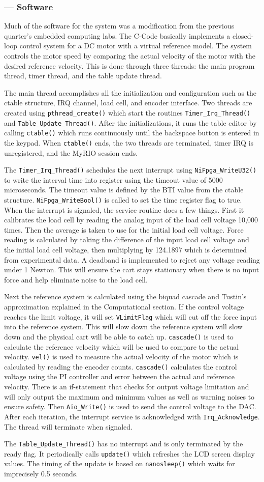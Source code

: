 \subsubsection*{ --- Software}
Much of the software for the system was a modification from the previous quarter's embedded computing labs. The C-Code basically implements a closed-loop control system for a DC motor with a virtual reference model. The system controls the motor speed by comparing the actual velocity of the motor with the desired reference velocity. This is done through three threads: the main program thread, timer thread, and the table update thread.

The main thread accomplishes all the initialization and configuration such as the ctable structure, IRQ channel, load cell, and encoder interface. Two threads are created using \verb|pthread_create()| which start the routines \verb|Timer_Irq_Thread()| and \verb|Table_Update_Thread()|. After the initializations, it runs the table editor by calling \verb|ctable()| which runs continuously until the backspace button is entered in the keypad. When \verb|ctable()| ends, the two threads are terminated, timer IRQ is unregistered, and the MyRIO session ends.

The \verb|Timer_Irq_Thread()| schedules the next interrupt using \verb|NiFpga_WriteU32()| to write the interval time into register using the timeout value of 5000 microseconds. The timeout value is defined by the BTI value from the ctable structure. \verb|NiFpga_WriteBool()| is called to set the time register flag to true. When the interrupt is signaled, the service routine does a few things. First it calibrates the load cell by reading the analog input of the load cell voltage 10,000 times. Then the average is taken to use for the initial load cell voltage. Force reading is calculated by taking the difference of the input load cell voltage and the initial load cell voltage, then multiplying by 124.1897 which is determined from experimental data. A deadband is implemented to reject any voltage reading under 1 Newton. This will ensure the cart stays stationary when there is no input force and help eliminate noise to the load cell.

Next the reference system is calculated using the biquad cascade and Tustin's approximation explained in the Computational section. If the control voltage reaches the limit voltage, it will set \verb|VLimitFlag| which will cut off the force input into the reference system. This will slow down the reference system will slow down and the physical cart will be able to catch up. \verb|cascade()| is used to calculate the reference velocity which will be used to compare to the actual velocity. \verb|vel()| is used to measure the actual velocity of the motor which is calculated by reading the encoder counts. \verb|cascade()| calculates the control voltage using the PI controller and error between the actual and reference velocity. There is an if-statement that checks for output voltage limitation and will only output the maximum and minimum values as well as warning noises to ensure safety. Then \verb|Aio_Write()| is used to send the control voltage to the DAC. After each iteration, the interrupt service is acknowledged with \verb|Irq_Acknowledge|. The thread will terminate when signaled.

The \verb|Table_Update_Thread()| has no interrupt and is only terminated by the ready flag. It periodically calls \verb|update()| which refreshes the LCD screen display values. The timing of the update is based on \verb|nanosleep()| which waits for imprecisely 0.5 seconds. 